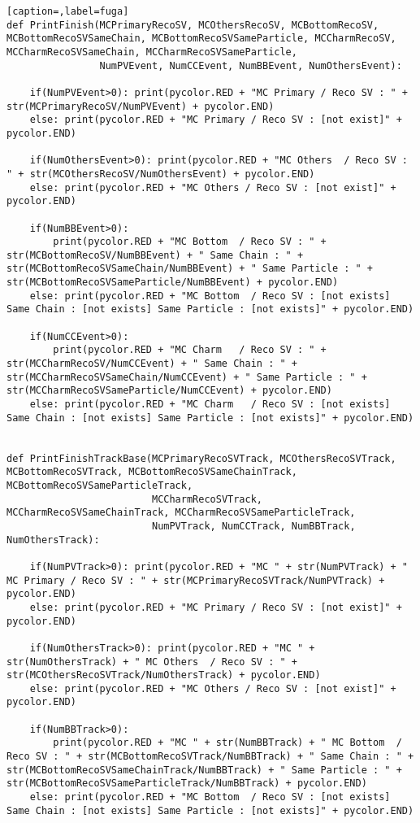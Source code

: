 \begin{lstlisting}[caption=,label=fuga]
def PrintFinish(MCPrimaryRecoSV, MCOthersRecoSV, MCBottomRecoSV, MCBottomRecoSVSameChain, MCBottomRecoSVSameParticle, MCCharmRecoSV, MCCharmRecoSVSameChain, MCCharmRecoSVSameParticle,
                NumPVEvent, NumCCEvent, NumBBEvent, NumOthersEvent):

    if(NumPVEvent>0): print(pycolor.RED + "MC Primary / Reco SV : " + str(MCPrimaryRecoSV/NumPVEvent) + pycolor.END)
    else: print(pycolor.RED + "MC Primary / Reco SV : [not exist]" + pycolor.END)

    if(NumOthersEvent>0): print(pycolor.RED + "MC Others  / Reco SV : " + str(MCOthersRecoSV/NumOthersEvent) + pycolor.END)
    else: print(pycolor.RED + "MC Others / Reco SV : [not exist]" + pycolor.END)

    if(NumBBEvent>0):
        print(pycolor.RED + "MC Bottom  / Reco SV : " + str(MCBottomRecoSV/NumBBEvent) + " Same Chain : " + str(MCBottomRecoSVSameChain/NumBBEvent) + " Same Particle : " + str(MCBottomRecoSVSameParticle/NumBBEvent) + pycolor.END)
    else: print(pycolor.RED + "MC Bottom  / Reco SV : [not exists] Same Chain : [not exists] Same Particle : [not exists]" + pycolor.END)

    if(NumCCEvent>0):
        print(pycolor.RED + "MC Charm   / Reco SV : " + str(MCCharmRecoSV/NumCCEvent) + " Same Chain : " + str(MCCharmRecoSVSameChain/NumCCEvent) + " Same Particle : " + str(MCCharmRecoSVSameParticle/NumCCEvent) + pycolor.END)
    else: print(pycolor.RED + "MC Charm   / Reco SV : [not exists] Same Chain : [not exists] Same Particle : [not exists]" + pycolor.END)


def PrintFinishTrackBase(MCPrimaryRecoSVTrack, MCOthersRecoSVTrack, MCBottomRecoSVTrack, MCBottomRecoSVSameChainTrack, MCBottomRecoSVSameParticleTrack, 
                         MCCharmRecoSVTrack, MCCharmRecoSVSameChainTrack, MCCharmRecoSVSameParticleTrack,
                         NumPVTrack, NumCCTrack, NumBBTrack, NumOthersTrack):

    if(NumPVTrack>0): print(pycolor.RED + "MC " + str(NumPVTrack) + " MC Primary / Reco SV : " + str(MCPrimaryRecoSVTrack/NumPVTrack) + pycolor.END)
    else: print(pycolor.RED + "MC Primary / Reco SV : [not exist]" + pycolor.END)

    if(NumOthersTrack>0): print(pycolor.RED + "MC " + str(NumOthersTrack) + " MC Others  / Reco SV : " + str(MCOthersRecoSVTrack/NumOthersTrack) + pycolor.END)
    else: print(pycolor.RED + "MC Others / Reco SV : [not exist]" + pycolor.END)

    if(NumBBTrack>0):
        print(pycolor.RED + "MC " + str(NumBBTrack) + " MC Bottom  / Reco SV : " + str(MCBottomRecoSVTrack/NumBBTrack) + " Same Chain : " + str(MCBottomRecoSVSameChainTrack/NumBBTrack) + " Same Particle : " + str(MCBottomRecoSVSameParticleTrack/NumBBTrack) + pycolor.END)
    else: print(pycolor.RED + "MC Bottom  / Reco SV : [not exists] Same Chain : [not exists] Same Particle : [not exists]" + pycolor.END)


\end{lstlisting}
